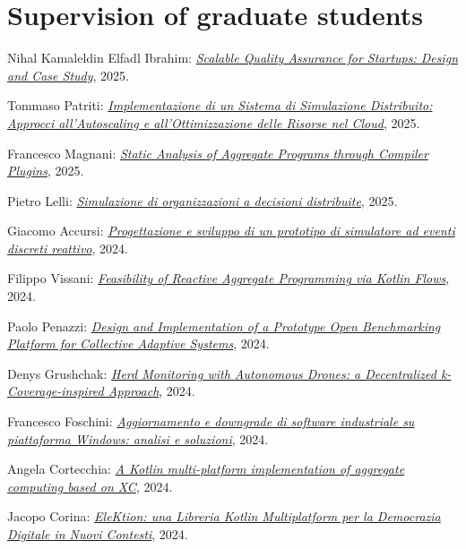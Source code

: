 \section{Supervision of graduate students}
\vspace{-1em}
\begin{innerlist}
    \item Nihal Kamaleldin Elfadl Ibrahim: \href{https://amslaurea.unibo.it/35535/}{\textit{Scalable Quality Assurance for Startups: Design and Case Study}}, 2025.
    \item Tommaso Patriti: \href{https://amslaurea.unibo.it/34457/}{\textit{Implementazione di un Sistema di Simulazione Distribuito: Approcci all'Autoscaling e all'Ottimizzazione delle Risorse nel Cloud}}, 2025.
    \item Francesco Magnani: \href{https://amslaurea.unibo.it/34470/}{\textit{Static Analysis of Aggregate Programs through Compiler Plugins}}, 2025.
    \item Pietro Lelli: \href{https://amslaurea.unibo.it/34440/}{\textit{Simulazione di organizzazioni a decisioni distribuite}}, 2025.
    \item Giacomo Accursi: \href{https://amslaurea.unibo.it/31065/}{\textit{Progettazione e sviluppo di un prototipo di simulatore ad eventi discreti reattivo}}, 2024.
    \item Filippo Vissani: \href{https://amslaurea.unibo.it/31108/}{\textit{Feasibility of Reactive Aggregate Programming via Kotlin Flows}}, 2024.
    \item Paolo Penazzi: \href{https://amslaurea.unibo.it/31110/}{\textit{Design and Implementation of a Prototype Open Benchmarking Platform for Collective Adaptive Systems}}, 2024.
    \item Denys Grushchak: \href{https://amslaurea.unibo.it/31105/}{\textit{Herd Monitoring with Autonomous Drones: a Decentralized k-Coverage-inspired Approach}}, 2024.
    \item Francesco Foschini: \href{https://amslaurea.unibo.it/31121/}{\textit{Aggiornamento e downgrade di software industriale su piattaforma Windows: analisi e soluzioni}}, 2024.
    \item Angela Cortecchia: \href{https://amslaurea.unibo.it/31080/}{\textit{A Kotlin multi-platform implementation of aggregate computing based on XC}}, 2024.
    \item Jacopo Corina: \href{https://amslaurea.unibo.it/31132/}{\textit{EleKtion: una Libreria Kotlin Multiplatform per la Democrazia Digitale in Nuovi Contesti}}, 2024.

\end{innerlist}
